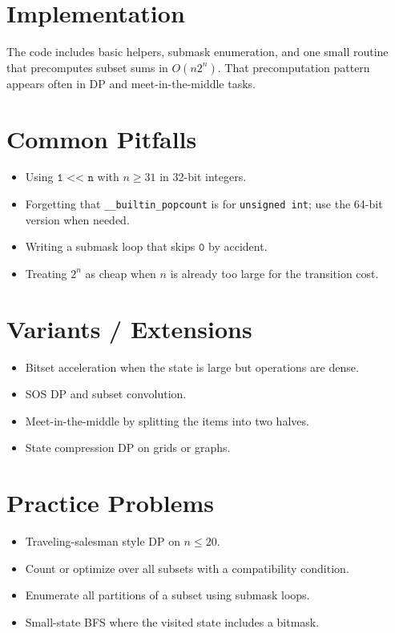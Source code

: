 \section*{Implementation}

The code includes basic helpers, submask enumeration, and one small routine that precomputes subset sums in
\(O(n 2^n)\). That precomputation pattern appears often in DP and meet-in-the-middle tasks.

\section*{Common Pitfalls}

\begin{itemize}
  \item Using \(\texttt{1 << n}\) with \(n \ge 31\) in 32-bit integers.
  \item Forgetting that \texttt{__builtin\_popcount} is for \texttt{unsigned int}; use the 64-bit version when needed.
  \item Writing a submask loop that skips \(\texttt{0}\) by accident.
  \item Treating \(2^n\) as cheap when \(n\) is already too large for the transition cost.
\end{itemize}

\section*{Variants / Extensions}

\begin{itemize}
  \item Bitset acceleration when the state is large but operations are dense.
  \item SOS DP and subset convolution.
  \item Meet-in-the-middle by splitting the items into two halves.
  \item State compression DP on grids or graphs.
\end{itemize}

\section*{Practice Problems}

\begin{itemize}
  \item Traveling-salesman style DP on \(n \le 20\).
  \item Count or optimize over all subsets with a compatibility condition.
  \item Enumerate all partitions of a subset using submask loops.
  \item Small-state BFS where the visited state includes a bitmask.
\end{itemize}

